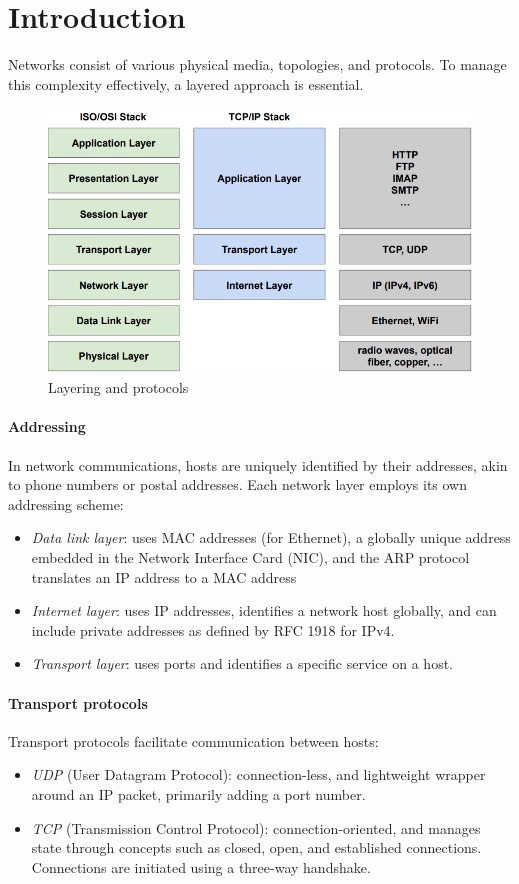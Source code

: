 \section{Introduction}

Networks consist of various physical media, topologies, and protocols. 
To manage this complexity effectively, a layered approach is essential.
\begin{figure}[H]
    \centering
    \includegraphics[width=0.75\linewidth]{images/lp.png}
    \caption{Layering and protocols}
\end{figure}

\paragraph*{Addressing}
In network communications, hosts are uniquely identified by their addresses, akin to phone numbers or postal addresses. 
Each network layer employs its own addressing scheme:
\begin{itemize}
    \item \textit{Data link layer}: uses MAC addresses (for Ethernet), a globally unique address embedded in the Network Interface Card (NIC), and the ARP protocol translates an IP address to a MAC address
    \item \textit{Internet layer}: uses IP addresses, identifies a network host globally, and can include private addresses as defined by RFC 1918 for IPv4.
    \item \textit{Transport layer}: uses ports and identifies a specific service on a host.
\end{itemize}

\paragraph*{Transport protocols}
Transport protocols facilitate communication between hosts:
\begin{itemize}
    \item \textit{UDP} (User Datagram Protocol): connection-less, and lightweight wrapper around an IP packet, primarily adding a port number.
    \item \textit{TCP} (Transmission Control Protocol): connection-oriented, and manages state through concepts such as closed, open, and established connections.
        Connections are initiated using a three-way handshake.
\end{itemize}

